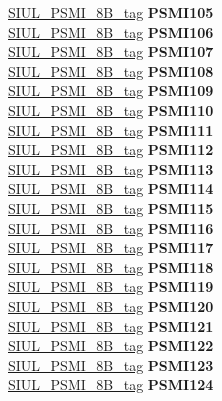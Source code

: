 \begin{DoxyCompactItemize}
\begin{tabbing}
\>\>\mbox{\hyperlink{unionSIUL__PSMI__8B__tag}{SIUL\_PSMI\_8B\_tag}} {\bfseries PSMI105}\\
\>\>\mbox{\hyperlink{unionSIUL__PSMI__8B__tag}{SIUL\_PSMI\_8B\_tag}} {\bfseries PSMI106}\\
\>\>\mbox{\hyperlink{unionSIUL__PSMI__8B__tag}{SIUL\_PSMI\_8B\_tag}} {\bfseries PSMI107}\\
\>\>\mbox{\hyperlink{unionSIUL__PSMI__8B__tag}{SIUL\_PSMI\_8B\_tag}} {\bfseries PSMI108}\\
\>\>\mbox{\hyperlink{unionSIUL__PSMI__8B__tag}{SIUL\_PSMI\_8B\_tag}} {\bfseries PSMI109}\\
\>\>\mbox{\hyperlink{unionSIUL__PSMI__8B__tag}{SIUL\_PSMI\_8B\_tag}} {\bfseries PSMI110}\\
\>\>\mbox{\hyperlink{unionSIUL__PSMI__8B__tag}{SIUL\_PSMI\_8B\_tag}} {\bfseries PSMI111}\\
\>\>\mbox{\hyperlink{unionSIUL__PSMI__8B__tag}{SIUL\_PSMI\_8B\_tag}} {\bfseries PSMI112}\\
\>\>\mbox{\hyperlink{unionSIUL__PSMI__8B__tag}{SIUL\_PSMI\_8B\_tag}} {\bfseries PSMI113}\\
\>\>\mbox{\hyperlink{unionSIUL__PSMI__8B__tag}{SIUL\_PSMI\_8B\_tag}} {\bfseries PSMI114}\\
\>\>\mbox{\hyperlink{unionSIUL__PSMI__8B__tag}{SIUL\_PSMI\_8B\_tag}} {\bfseries PSMI115}\\
\>\>\mbox{\hyperlink{unionSIUL__PSMI__8B__tag}{SIUL\_PSMI\_8B\_tag}} {\bfseries PSMI116}\\
\>\>\mbox{\hyperlink{unionSIUL__PSMI__8B__tag}{SIUL\_PSMI\_8B\_tag}} {\bfseries PSMI117}\\
\>\>\mbox{\hyperlink{unionSIUL__PSMI__8B__tag}{SIUL\_PSMI\_8B\_tag}} {\bfseries PSMI118}\\
\>\>\mbox{\hyperlink{unionSIUL__PSMI__8B__tag}{SIUL\_PSMI\_8B\_tag}} {\bfseries PSMI119}\\
\>\>\mbox{\hyperlink{unionSIUL__PSMI__8B__tag}{SIUL\_PSMI\_8B\_tag}} {\bfseries PSMI120}\\
\>\>\mbox{\hyperlink{unionSIUL__PSMI__8B__tag}{SIUL\_PSMI\_8B\_tag}} {\bfseries PSMI121}\\
\>\>\mbox{\hyperlink{unionSIUL__PSMI__8B__tag}{SIUL\_PSMI\_8B\_tag}} {\bfseries PSMI122}\\
\>\>\mbox{\hyperlink{unionSIUL__PSMI__8B__tag}{SIUL\_PSMI\_8B\_tag}} {\bfseries PSMI123}\\
\>\>\mbox{\hyperlink{unionSIUL__PSMI__8B__tag}{SIUL\_PSMI\_8B\_tag}} {\bfseries PSMI124}\\

\end{tabbing}
\end{DoxyCompactItemize}
